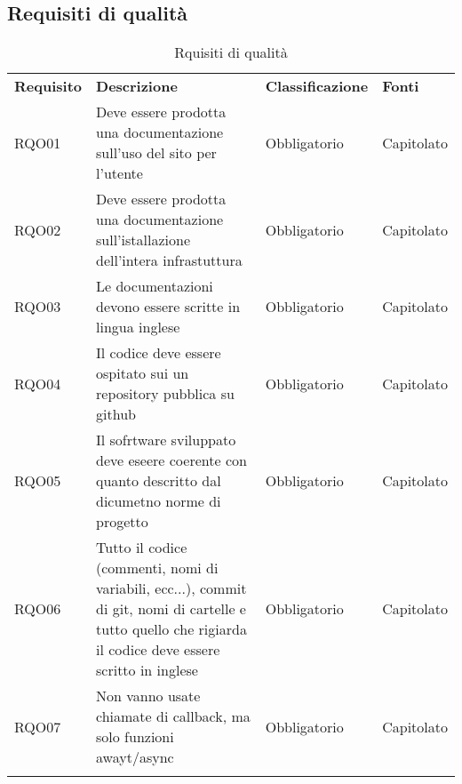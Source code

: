 \subsection{Requisiti di qualità}
\begin{center}
    \centering
    \renewcommand{\arraystretch}{1.8}
    \label{tab:RequisitiQualita}
    \begin{longtable}[!h]{p{50px} p{200px} p{100px} p{50px}}
        \rowcolor{logo!70} \textbf{Requisito} & \textbf{Descrizione}                                                                                                                                        & \textbf{Classificazione} & \textbf{Fonti} \\
        RQO01                                 & Deve essere prodotta una documentazione sull'uso del sito per l'utente                                                                                      & Obbligatorio             & Capitolato     \\
        RQO02                                 & Deve essere prodotta una documentazione sull'istallazione dell'intera infrastuttura                                                                         & Obbligatorio             & Capitolato     \\
        RQO03                                 & Le documentazioni devono essere scritte in lingua inglese                                                                                                   & Obbligatorio             & Capitolato     \\
        RQO04                                 & Il codice deve essere ospitato sui un repository pubblica su github                                                                                         & Obbligatorio             & Capitolato     \\
        RQO05                                 & Il sofrtware sviluppato deve eseere coerente con quanto descritto dal dicumetno norme di progetto                                                           & Obbligatorio             & Capitolato     \\
        RQO06                                 & Tutto il codice (commenti, nomi di variabili, ecc...), commit di git, nomi di cartelle e tutto quello che rigiarda il codice deve essere scritto in inglese & Obbligatorio             & Capitolato     \\
        RQO07                                 & Non vanno usate chiamate di callback, ma solo funzioni awayt/async                                                                                          & Obbligatorio             & Capitolato     \\
        \rowcolor{white}\caption{Rquisiti di qualità}
    \end{longtable}
\end{center}
